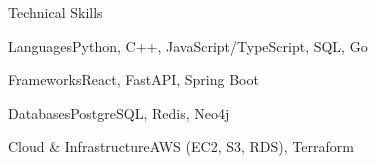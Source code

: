 \documentclass[
	11pt
]{../../../template}
\begin{document}
	\begin{rSection}{T}{echnical Skills}
		\begin{rSet}{Languages}{Python, C++, JavaScript/TypeScript, SQL, Go}
		\end{rSet}
		\begin{rSet}{Frameworks}{React, FastAPI, Spring Boot}
		\end{rSet}
		\begin{rSet}{Databases}{PostgreSQL, Redis, Neo4j}
		\end{rSet}
		\begin{rSet}{Cloud \& Infrastructure}{AWS (EC2, S3, RDS), Terraform}
		\end{rSet}
	\end{rSection}
\end{document}
